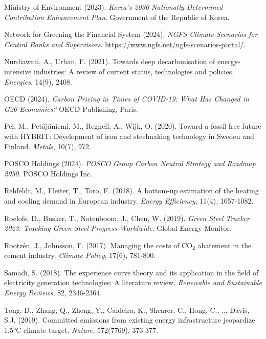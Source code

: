 \documentclass[preprint,5p,authoryear]{elsarticle}
\begin{document}
\begin{thebibliography}{99}
 Ministry of Environment (2023). \textit{Korea's 2030 Nationally Determined Contribution Enhancement Plan}. Government of the Republic of Korea.

 Network for Greening the Financial System (2024). \textit{NGFS Climate Scenarios for Central Banks and Supervisors}. \url{https://www.ngfs.net/ngfs-scenarios-portal/}.

 Nurdiawati, A., Urban, F. (2021). Towards deep decarbonisation of energy-intensive industries: A review of current status, technologies and policies. \textit{Energies}, 14(9), 2408.

 OECD (2024). \textit{Carbon Pricing in Times of COVID-19: What Has Changed in G20 Economies?} OECD Publishing, Paris.

 Pei, M., Petäjäniemi, M., Regnell, A., Wijk, O. (2020). Toward a fossil free future with HYBRIT: Development of iron and steelmaking technology in Sweden and Finland. \textit{Metals}, 10(7), 972.

 POSCO Holdings (2024). \textit{POSCO Group Carbon Neutral Strategy and Roadmap 2050}. POSCO Holdings Inc.

 Rehfeldt, M., Fleiter, T., Toro, F. (2018). A bottom-up estimation of the heating and cooling demand in European industry. \textit{Energy Efficiency}, 11(4), 1057-1082.

 Roelofs, D., Busker, T., Notenboom, J., Chen, W. (2019). \textit{Green Steel Tracker 2023: Tracking Green Steel Progress Worldwide}. Global Energy Monitor.

 Rootzén, J., Johnsson, F. (2017). Managing the costs of CO$_2$ abatement in the cement industry. \textit{Climate Policy}, 17(6), 781-800.

 Samadi, S. (2018). The experience curve theory and its application in the field of electricity generation technologies: A literature review. \textit{Renewable and Sustainable Energy Reviews}, 82, 2346-2364.

 Tong, D., Zhang, Q., Zheng, Y., Caldeira, K., Shearer, C., Hong, C., ... Davis, S.J. (2019). Committed emissions from existing energy infrastructure jeopardize 1.5°C climate target. \textit{Nature}, 572(7769), 373-377.


\end{thebibliography}
\end{document}
